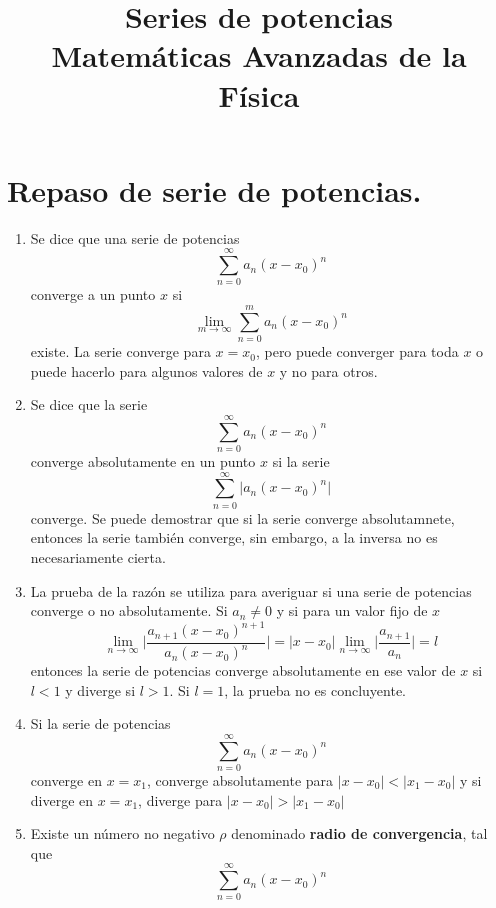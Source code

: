 
\title{ Series de potencias \\ \large {Matemáticas Avanzadas de la Física}}
\date{ }

\renewcommand\labelenumii{\theenumi.{\arabic{enumii}}}
\maketitle
\fontsize{14}{14}\selectfont
\section{Repaso de serie de potencias.}
\begin{enumerate}
\item Se dice que una serie de potencias
\[ \sum_{n=0}^{\infty} a_{n} (x - x_{0})^{n} \]
converge a un punto $x$ si
\[ \lim_{m \to \infty} \sum_{n=0}^{m} a_{n} (x - x_{0})^{n} \]
existe. La serie converge para $x = x_{0}$, pero puede converger para toda $x$ o puede hacerlo para algunos valores de $x$ y no para otros.
\item Se dice que la serie
\[ \sum_{n=0}^{\infty} a_{n} (x - x_{0})^{n} \]
converge absolutamente en un punto $x$ si la serie
\[ \sum_{n=0}^{\infty} \vert a_{n} (x - x_{0})^{n} \vert \]
converge. Se puede demostrar que si la serie converge absolutamnete, entonces la serie también converge, sin embargo, a la inversa no es necesariamente cierta.
\item La prueba de la razón se utiliza para averiguar si una serie de potencias converge o no absolutamente. Si $a_{n} \neq 0$ y si para un valor fijo de $x$
\[ \lim_{n \to \infty} \bigg| \dfrac{a_{n+1}(x - x_{0})^{n+1}}{a_{n} (x - x_{0})^{n}} \bigg| =  \vert x - x_{0} \vert \lim_{n \to \infty} \bigg| \dfrac{a_{n+1}}{a_{n}} \bigg| = l \]
entonces la serie de potencias converge absolutamente en ese valor de $x$ si $ l < 1$ y diverge si $l > 1$. Si $l = 1$, la prueba no es concluyente.
\item Si la serie de potencias
\[ \sum_{n=0}^{\infty} a_{n} (x - x_{0})^{n} \]
converge en $x =  x_{1}$, converge absolutamente para $ \vert x - x_{0} \vert < \vert x_{1} - x_{0} \vert $ y si diverge en $x = x_{1}$, diverge para $\vert x - x_{0} \vert > \vert x_{1} - x_{0} \vert $
\item Existe un número no negativo $\rho$ denominado \textbf{radio de convergencia}, tal que
\[ \sum_{n=0}^{\infty} a_{n} (x - x_{0})^{n} \]

\end{enumerate}
